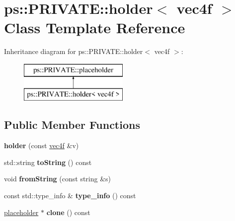 \hypertarget{classps_1_1PRIVATE_1_1holder_3_01vec4f_01_4}{}\section{ps\+:\+:P\+R\+I\+V\+A\+T\+E\+:\+:holder$<$ vec4f $>$ Class Template Reference}
\label{classps_1_1PRIVATE_1_1holder_3_01vec4f_01_4}
Inheritance diagram for ps\+:\+:P\+R\+I\+V\+A\+T\+E\+:\+:holder$<$ vec4f $>$\+:\begin{figure}[H]
\begin{center}
\leavevmode
\includegraphics[height=2.000000cm]{classps_1_1PRIVATE_1_1holder_3_01vec4f_01_4}
\end{center}
\end{figure}
\subsection*{Public Member Functions}
\begin{DoxyCompactItemize}
\item 
\hypertarget{classps_1_1PRIVATE_1_1holder_3_01vec4f_01_4_aa064c4552601de818ab29094fce8c4b7}{}{\bfseries holder} (const \hyperlink{classps_1_1base_1_1Vec4}{vec4f} \&v)\label{classps_1_1PRIVATE_1_1holder_3_01vec4f_01_4_aa064c4552601de818ab29094fce8c4b7}

\item 
\hypertarget{classps_1_1PRIVATE_1_1holder_3_01vec4f_01_4_a257b7630a6a46f725999e578f599413f}{}std\+::string {\bfseries to\+String} () const \label{classps_1_1PRIVATE_1_1holder_3_01vec4f_01_4_a257b7630a6a46f725999e578f599413f}

\item 
\hypertarget{classps_1_1PRIVATE_1_1holder_3_01vec4f_01_4_a245b964ae8bbb1347a3876dad358d36a}{}void {\bfseries from\+String} (const string \&s)\label{classps_1_1PRIVATE_1_1holder_3_01vec4f_01_4_a245b964ae8bbb1347a3876dad358d36a}

\item 
\hypertarget{classps_1_1PRIVATE_1_1holder_3_01vec4f_01_4_ae5ec0c1907a61cbce5a62b99fd702902}{}const std\+::type\+\_\+info \& {\bfseries type\+\_\+info} () const \label{classps_1_1PRIVATE_1_1holder_3_01vec4f_01_4_ae5ec0c1907a61cbce5a62b99fd702902}

\item 
\hypertarget{classps_1_1PRIVATE_1_1holder_3_01vec4f_01_4_ad5590c2522fa26294998e4b4593a279d}{}\hyperlink{classps_1_1PRIVATE_1_1placeholder}{placeholder} $\ast$ {\bfseries clone} () const \label{classps_1_1PRIVATE_1_1holder_3_01vec4f_01_4_ad5590c2522fa26294998e4b4593a279d}

\end{DoxyCompactItemize}
